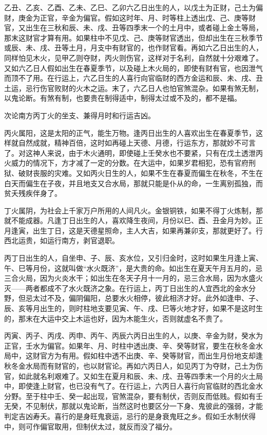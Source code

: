 \documentclass[a5paper,oneside,12pt]{ctexbook}
\begin{document}
乙丑、乙亥、乙酉、乙未、乙巳、乙卯六乙日出生的人，以戊土为正财，己土为偏财，庚金为正官，辛金为偏官。假如这时年、月、时等柱上透出戊、己、庚等财官，又出生在三秋和辰、未、戌、丑等四季末一个的土月中，或者碰上金土等局，那末这财官才算有用。如果柱中不见戊、己、庚等财官透出，但却出生在三秋季节或辰、未、戌、丑等土月，月支中有财官的，也作财官看。再如六乙日出生的人，同样怕见木火，见甲乙则夺财，丙火则伤官，这样对于名利，自然就十分艰难了。又如六乙日人假如出生在春夏季节，以及碰上木火局的，即使有财有官，也因泄气而顶不了用。在行运上，六乙日生的人喜行向官临财的西方金运和辰、未、戌、丑土运，忌行伤官败财的火木之运。末了，六乙日人也怕官煞混杂。如果有煞无制，以鬼论断。有煞有制，也要贵在制得适中，制得太过或不及的，都不是福。

次论南方丙丁火的坐支、兼得月时和行运吉凶。

丙火属阳，这是太阳的正气，能生万物。逢丙日出生的人喜欢出生在春夏季节，这样就自然成就，精神百倍，这时如再碰上天德、月德，行运东方，那就妙不可言了。对这神人来说，由于木火通明，即使碰上壬癸水也不要紧，只有在戊土透泄丙火威力的情况下，方才减了一定的分数。在大运中，如果岁君相犯，恐有官府刑狱、破财丧服的灾难。又如丙火日生的人，如果不生在春夏而偏生在秋冬，不生在白天而偏生在子夜，并且地支又合水局，那就只能是仆从的命，一生离别孤独，而贫夭残疾伴身了。

丁火属阴，为社会上千家万户所用的人间凡火。金银铜铁，如果不得丁火炼制，那就不能成器。凡逢丁日出生的人，喜欢降生夜间，月份以巳、酉、丑金月为妙。正月逢寅，出生丁日，这是天德星照命，主人大吉，如果再兼卯支，那就更好了。行西北运贵，如运行南方，剥官退职。

丙丁日出生的人，自坐申、子、辰、亥水位，又引归金时，这时如果生月逢上寅、午、巳等月份，这就叫做“水火既济”，是大贵的命。如出生在夏天午月五月的，忌三合火局，因为火炎水干；如出生在冬天子月十一月的，忌三合水局，因为水盛火灭——两者都成不了水火既济之象。在行运上，丙丁日出生的人宜西北的金水分野，但忌太过不及，偏阴偏阳，总要水火相停，彼此相济才好。此外如逢申、子、辰、亥等月出生的，则时柱地支要见寅、午、戌、巳等火地才好，如果不是这时生的，那末在大运中交上木运也好，因为木能生火，否则就虚名不贵了。

丙寅、丙子、丙戌、丙申、丙午、丙辰六丙日出生的人，以庚、辛金为财，癸水为正官，壬水为偏官。如果年、月、时柱中透出庚、辛、癸等财官，要生在秋冬金水局中，这财官方为有用。假如柱中透不出庚、辛、癸等财官，而出生月份地支却逢秋冬金水局而有财官的，也以财官论。再如六丙日人，如见丙丁为夺财，己土为伤官，如此就名利艰难了。又如生在夏月和辰、未、戌、丑等四季末一个月的火土局中，即使逢上财官，也已没有气了。在行运上，六丙日人喜行向官临财的西北金水分野。至于柱中壬、癸一起出现，官煞混杂，要有制伏，否则反而低贱。假如有壬无癸，不见制伏，那就以鬼论断，当然这时也要区分一下身、鬼彼此的强弱，才能判定吉凶寿夭。喜行的是身旺鬼衰运，忌行的是身衰鬼旺之乡。假如壬水制伏得中，则可作偏官取用，但制伏太过，就反而没了福分。
\end{document}

